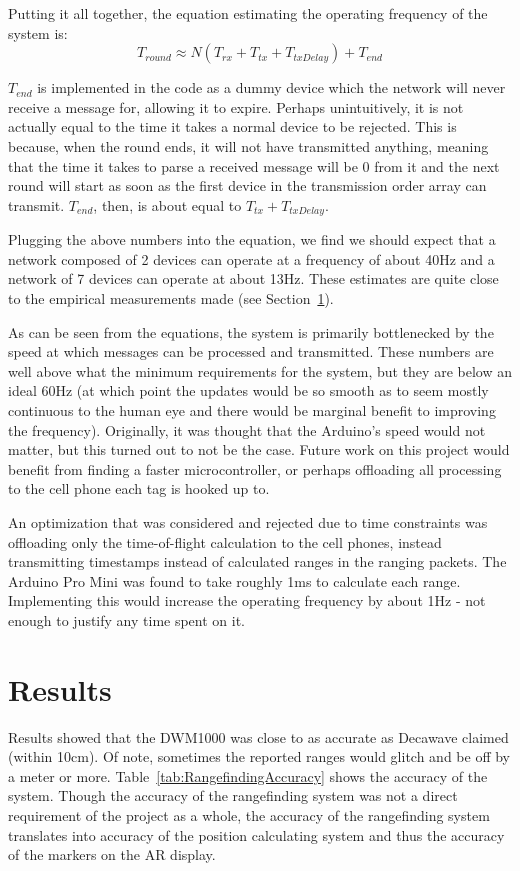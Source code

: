 Putting it all together, the equation estimating the operating frequency of the system is:
\[
	T_{round} \approx N(T_{rx} + T_{tx} + T_{txDelay}) + T_{end}
\]

$T_{end}$ is implemented in the code as a dummy device which the network will never receive a message for, allowing it to expire. Perhaps unintuitively, it is not actually equal to the time it takes a normal device to be rejected. This is because, when the round ends, it will not have transmitted anything, meaning that the time it takes to parse a received message will be 0 from it and the next round will start as soon as the first device in the transmission order array can transmit. $T_{end}$, then, is about equal to $T_{tx} + T_{txDelay}$.

Plugging the above numbers into the equation, we find we should expect that a network composed of 2 devices can operate at a frequency of about 40Hz and a network of 7 devices can operate at about 13Hz. These estimates are quite close to the empirical measurements made (see Section~\ref{RangefindingResults}).

As can be seen from the equations, the system is primarily bottlenecked by the speed at which messages can be processed and transmitted. These numbers are well above what the minimum requirements for the system, but they are below an ideal 60Hz (at which point the updates would be so smooth as to seem mostly continuous to the human eye and there would be marginal benefit to improving the frequency). Originally, it was thought that the Arduino's speed would not matter, but this turned out to not be the case. Future work on this project would benefit from finding a faster microcontroller, or perhaps offloading all processing to the cell phone each tag is hooked up to. 

An optimization that was considered and rejected due to time constraints was offloading only the time-of-flight calculation to the cell phones, instead transmitting timestamps instead of calculated ranges in the ranging packets. The Arduino Pro Mini was found to take roughly 1ms to calculate each range. Implementing this would increase the operating frequency by about 1Hz - not enough to justify any time spent on it.

\section{Results}
\label{RangefindingResults}
Results showed that the DWM1000 was close to as accurate as Decawave claimed (within 10cm). Of note, sometimes the reported ranges would glitch and be off by a meter or more. Table~\ref{tab:RangefindingAccuracy} shows the accuracy of the system. Though the accuracy of the rangefinding system was not a direct requirement of the project as a whole, the accuracy of the rangefinding system translates into accuracy of the position calculating system and thus the accuracy of the markers on the AR display.

